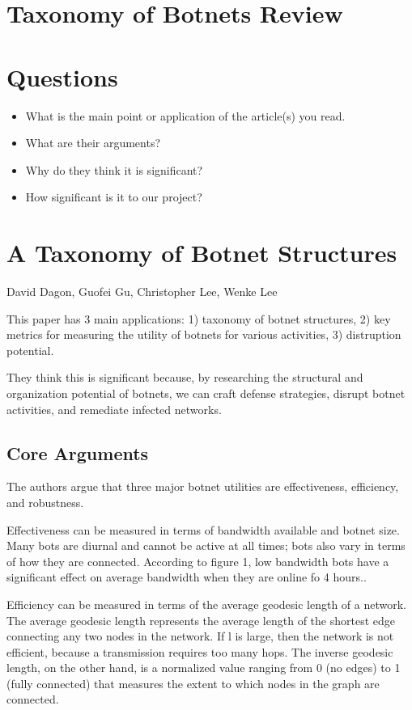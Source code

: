 \documentclass{article}
\begin{document}
\section{Taxonomy of Botnets Review}

\section{Questions}
\begin{itemize}
\item What is the main point or application of the article(s) you read.
\item What are their arguments?
\item Why do they think it is significant?
\item How significant is it to our project?
\end{itemize}


\section{A Taxonomy of Botnet Structures}

David Dagon, Guofei Gu, Christopher Lee, Wenke Lee

This paper has 3 main applications: 1) taxonomy of botnet structures, 2) key metrics for measuring the utility of botnets for various activities, 3) distruption potential.

They think this is significant because, by researching the structural and organization potential of botnets, we can craft defense strategies, disrupt botnet activities, and remediate infected networks.\cite{dagon:model}

\subsection{Core Arguments}


The authors argue that three major botnet utilities are effectiveness, efficiency, and robustness.  

Effectiveness can be measured in terms of bandwidth available and botnet size.  Many bots are diurnal and cannot be active at all times; bots also vary in terms of how they are connected. According to figure 1, low bandwidth bots have a significant effect on average bandwidth when they are online fo 4 hours..  


Efficiency can be measured in terms of the average geodesic length of a network.  The average geodesic length represents the average length of the shortest edge connecting any two nodes in the network.  If l is large, then the network is not efficient, because a transmission requires too many hops.  The inverse geodesic length, on the other hand, is a normalized value ranging from 0 (no edges) to 1 (fully connected) that measures the extent to which nodes in the graph are connected.  
\end{document}
